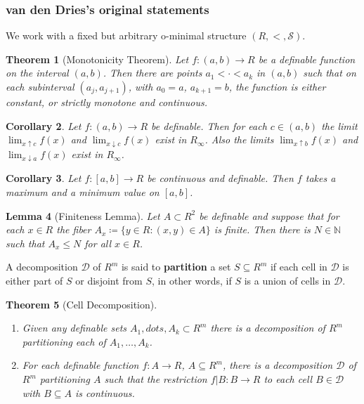 \documentclass{amsart}
\newtheorem{theorem}{Theorem}[section]
\newtheorem{lemma}[theorem]{Lemma}
\newtheorem{corollary}[theorem]{Corollary}
\theoremstyle{definition}
\numberwithin{equation}{section}
\begin{document}
\subsubsection{van den Dries's original statements}

We work with a fixed but arbitrary o-minimal structure $(R,<,\mathcal{S})$.

\begin{theorem}[Monotonicity Theorem]
    Let $f: (a,b)\to R$ be a definable function on the interval $(a,b)$.
    Then there are points $a_1 < \cdot < a_k$ in $(a,b)$ such that on each subinterval $(a_j,a_{j+1})$,
    with $a_0 = a$, $a_{k+1} = b$,
    the function is either constant, or strictly monotone and continuous.
\end{theorem}

\begin{corollary}
    Let $f: (a,b) \to R$ be definable.
    Then for each $c\in (a,b)$ the limit $\lim_{x\uparrow c}f(x)$
    and $\lim_{x\downarrow c}f(x)$ exist in $R_{\infty}$.
    Also the limits $\lim_{x\uparrow b}f(x)$ and $\lim_{x\downarrow a}f(x)$ exist in $R_{\infty}$.
\end{corollary}

\begin{corollary}
    Let $f: [a,b]\to R$ be continuous and definable.
    Then $f$ takes a maximum and a minimum value on $[a,b]$.
\end{corollary}

\begin{lemma}[Finiteness Lemma]
    Let $A \subset R^2$ be definable and suppose that for each $x\in R$
    the fiber $A_x \coloneq \{y\in R\colon (x,y)\in A\}$ is finite.
    Then there is $N \in \mathbb{N}$ such that $A_x \le N$ for all $x\in R$.
\end{lemma}

A decomposition $\mathcal{D}$ of $R^m$ is said to \textbf{partition}
a set $S \subseteq R^m$ if each cell in $\mathcal{D}$ is
either part of $S$ or disjoint from $S$,
in other words, if $S$ is a union of cells in $\mathcal{D}$.
\begin{theorem}[Cell Decomposition]
    \hfill
    \begin{enumerate}[label = {$\mathrm{(\Roman*_{m})}$}]
        \item Given any definable sets $A_1,dots,A_k \subset R^m$ there is a decomposition of $R^m$ partitioning each of $A_1,\dots,A_k$.
        \item For each definable function $f: A \to R$, $A \subseteq R^m$,
        there is a decomposition $\mathcal{D}$ of $R^m$ partitioning $A$ such that 
        the restriction $f|B: B \to R$ to each cell $B \in \mathcal{D}$ with $B \subseteq A$ is continuous.
    \end{enumerate}
\end{theorem}
\end{document}

